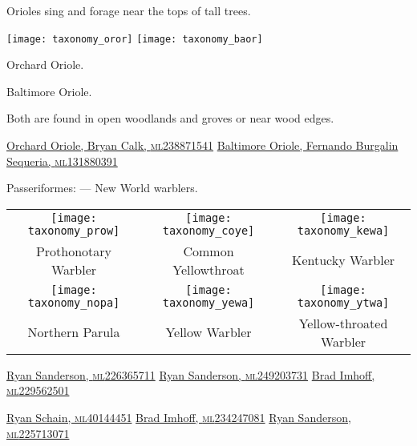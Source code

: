 \documentclass[t]{beamer}
\newcommand{\backoneline}{\vspace{-\baselineskip}}
\begin{document}
%

\begin{frame}{Orioles sing and forage near the tops of tall trees.}
	
	\texttt{[image: taxonomy\_oror]}\hfill
	\texttt{[image: taxonomy\_baor]}
	
	\backoneline
	
	\begin{multicols}{2}
		Orchard Oriole.
		

		\columnbreak
		
		Baltimore Oriole.
		
	\end{multicols}	
	
	Both are found in open woodlands and groves or near wood edges.
	
	\vfilll
	
	\tiny
	
	\href{https://macaulaylibrary.org/asset/238871541}{Orchard Oriole, Bryan Calk, \textsc{ml}238871541} 
	\hfill 
	\href{https://macaulaylibrary.org/asset/131880391}{Baltimore Oriole, Fernando Burgalin Sequeria, \textsc{ml}131880391} 
	
\end{frame}

%
\begin{frame}{Passeriformes:  — New World warblers.}
	
	\begin{tabular}{ccc}
	\texttt{[image: taxonomy\_prow]} &
	\texttt{[image: taxonomy\_coye]} &
	\texttt{[image: taxonomy\_kewa]} \tabularnewline
	Prothonotary Warbler & Common Yellowthroat & Kentucky Warbler \tabularnewline[1em]
	\texttt{[image: taxonomy\_nopa]} &
	\texttt{[image: taxonomy\_yewa]} &
	\texttt{[image: taxonomy\_ytwa]} \tabularnewline
	Northern Parula &
	Yellow Warbler &
	Yellow-throated Warbler \tabularnewline
\end{tabular}

	
	\vfilll
	
	\tiny
	
	\href{https://macaulaylibrary.org/asset/226365711}{Ryan Sanderson, \textsc{ml}226365711} \hfill 
	\href{https://macaulaylibrary.org/asset/249203731}{Ryan Sanderson, \textsc{ml}249203731} \hfill
	\href{https://macaulaylibrary.org/asset/229562501}{Brad Imhoff, \textsc{ml}229562501}

	\href{https://macaulaylibrary.org/asset/40144451}{Ryan Schain, \textsc{ml}40144451}
	\hfill
	\href{https://macaulaylibrary.org/asset/234247081}{Brad Imhoff, \textsc{ml}234247081} 
	\hfill
	\href{https://macaulaylibrary.org/asset/225713071}{Ryan Sanderson, \textsc{ml}225713071} 
	
	
\end{frame}
\end{document}
